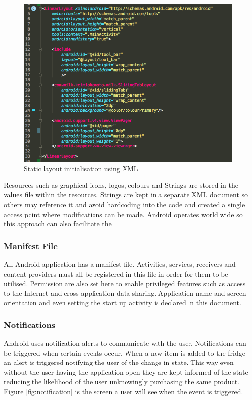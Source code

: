 \documentclass[a4paper, 11pt]{article}
\begin{document}
\begin{figure}[!htbp]
\centering
\includegraphics[width=\textwidth]{xml}
\caption{Static layout initialisation using XML} \label{fig:xml}
\end{figure}


Resources such as graphical icons, logos, colours and Strings are stored in the values file within the resources. Strings are kept in a separate XML document so others may reference it and avoid hardcoding into the code and created a single access point where modifications can be made. Android operates world wide so this approach can also facilitate the 

\subsubsection{Manifest File}
All Android application has a manifest file. Activities, services, receivers and content providers must all be registered in this file in order for them to be utilised. Permission are also set here to enable privileged features such as access to the Internet and cross application data sharing. Application name and screen orientation and even setting the start up activity is declared in this document.

\subsubsection{Notifications}
Android uses notification alerts to communicate with the user. Notifications can be triggered when certain events occur. When a new item is added to the fridge an alert is triggered notifying the user of the change in state. This way even without the user having the application open they are kept informed of the state reducing the likelihood of the user unknowingly purchasing the same product. Figure \ref{fig:notification} is the screen a user will see when the event is triggered.
\end{document}
